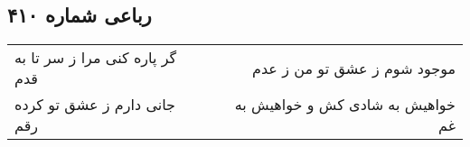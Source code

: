 \begin{center}
\section*{رباعی شماره ۴۱۰}
\label{sec:sh410}
\begin{longtable}{l p{0.5cm} r}
گر پاره کنی مرا ز سر تا به قدم
&&
موجود شوم ز عشق تو من ز عدم
\\
جانی دارم ز عشق تو کرده رقم
&&
خواهیش به شادی کش و خواهیش به غم
\\
\end{longtable}
\end{center}

